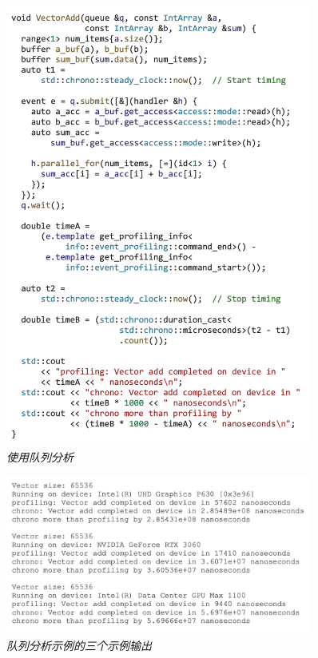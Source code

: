 \begin{figure}[H]
	\centering
	\includegraphics[width=0.9\textwidth]{figs/F13.7.png}
	\caption{\textit{使用队列分析 }}
\end{figure}

\begin{figure}[H]
	\centering
	\includegraphics[width=0.9\textwidth]{figs/F13.8.png}
	\caption{\textit{队列分析示例的三个示例输出 }}
\end{figure}

